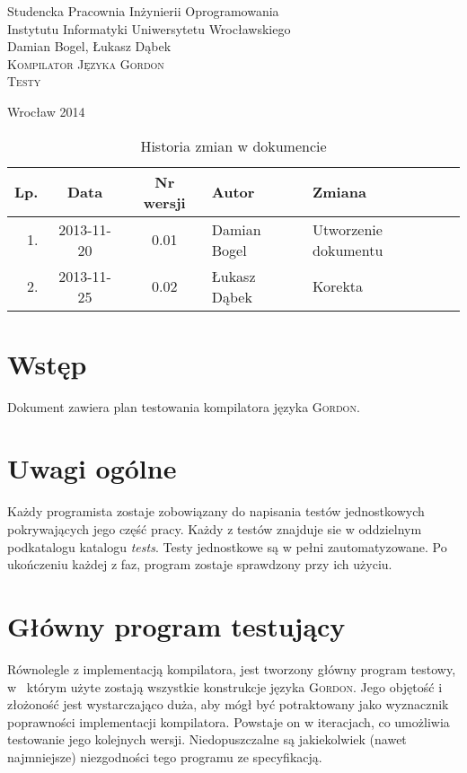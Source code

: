 \documentclass{documentation}
\begin{document}
\begin{titlepage}
\begin{center}
Studencka Pracownia Inżynierii Oprogramowania\\
Instytutu Informatyki Uniwersytetu Wrocławskiego\\[6cm]

Damian Bogel, Łukasz Dąbek\\[1cm]
\textsc{\LARGE Kompilator Języka Gordon}\\[0.5cm]
\textsc{\large Testy}

\vfill
Wrocław 2014 \\[2.5cm]

\end{center}
\end{titlepage}

\newpage
\begin{table}
	\centering
    \captionsetup{name=Tabela,labelsep=period}
	\caption{Historia zmian w dokumencie}
		\begin{tabular}{|r|c|c|l|l|}
		\hline
		Lp.  & Data       & Nr wersji & Autor                 & Zmiana \\ \hline
		1.   & 2013-11-20 & 0.01 & Damian Bogel & Utworzenie dokumentu \\ \hline
		2.   & 2013-11-25 & 0.02 & Łukasz Dąbek & Korekta \\ \hline
	\end{tabular}
\end{table}
\newpage

\tableofcontents
\setcounter{page}{2}

\newpage

\section{Wstęp}
\noindent Dokument zawiera plan testowania kompilatora języka
\textsc{Gordon}.

\section{Uwagi ogólne}
\noindent Każdy programista zostaje zobowiązany do napisania testów
jednostkowych pokrywających jego część pracy. Każdy z testów znajduje sie w
oddzielnym podkatalogu katalogu \emph{tests}. Testy jednostkowe są w pełni
zautomatyzowane. Po ukończeniu każdej z faz, program zostaje sprawdzony przy
ich użyciu.

\section{Główny program testujący}
\noindent Równolegle z implementacją kompilatora, jest tworzony główny program
testowy, w~ którym użyte zostają wszystkie konstrukcje języka \textsc{Gordon}.
Jego objętość i złożoność jest wystarczająco duża, aby mógł być potraktowany
jako wyznacznik poprawności implementacji kompilatora. Powstaje on w iteracjach,
co umożliwia testowanie jego kolejnych wersji. Niedopuszczalne są
jakiekolwiek (nawet najmniejsze) niezgodności tego programu ze specyfikacją.
\end{document}
